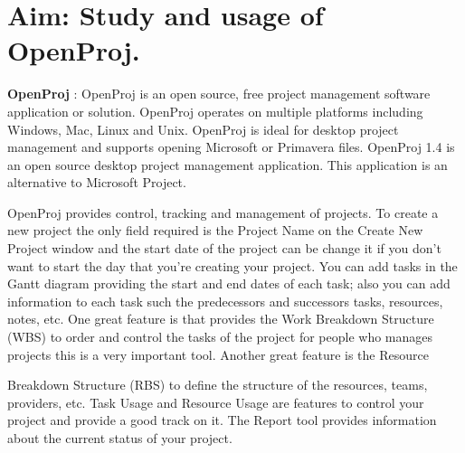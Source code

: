 \section*{\fontsize{16}{14}\selectfont Aim: Study and usage of OpenProj.}
    
{\bf OpenProj} : OpenProj is an open source, free project management software application or solution. OpenProj operates on multiple platforms including Windows, Mac, 
Linux and Unix. OpenProj is ideal for desktop project management and supports opening Microsoft 
or Primavera files. OpenProj 1.4 is an open source desktop project management 
application. This application is an alternative to Microsoft Project.

OpenProj provides control, tracking and management of projects. To create a new 
project the only field required is the Project Name on the Create New Project 
window and the start date of the project can be change it if you don't want to 
start the day that you're creating your project. You can add tasks in the Gantt 
diagram providing the start and end dates of each task; also you can add 
information to each task such the predecessors and successors tasks, resources, 
notes, etc. One great feature is that provides the Work Breakdown Structure
 (WBS) to order and control the tasks of the project for people who manages 
projects this is a very important tool. Another great feature is the Resource

Breakdown Structure (RBS) to define the structure of the resources, teams, 
providers, etc. Task Usage and Resource Usage are features to control your project and provide a good track on it. The Report tool provides information about the current status of your project.

